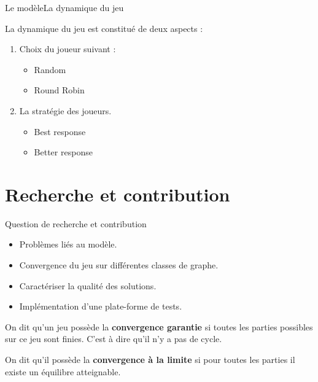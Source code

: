 \documentclass{beamer}
\begin{document}
  \begin{frame}{Le modèle}{La dynamique du jeu}

    La dynamique du jeu est constitué de deux aspects :\\

    \begin{enumerate}
      \item Choix du joueur suivant :
        \begin{itemize}
          \item Random
          \item Round Robin\\
        \end{itemize}

      \item La stratégie des joueurs.
        \begin{itemize}
          \item Best response
          \item Better response
        \end{itemize}
    \end{enumerate}
  \end{frame}

  \section{Recherche et contribution}
  \begin{frame}{Question de recherche et contribution}
    \begin{itemize}
      \item Problèmes liés au modèle.
      \item Convergence du jeu sur différentes classes de graphe.
      \item Caractériser la qualité des solutions.
      \item Implémentation d'une plate-forme de tests.
  \end{itemize}

  On dit qu'un jeu possède la \textbf{convergence garantie} si toutes les parties possibles sur ce jeu sont finies. C'est à dire qu'il n'y a pas de cycle.

  On dit qu'il possède la \textbf{convergence à la limite} si pour toutes les parties il existe un équilibre atteignable.
  \end{frame}
\end{document}
